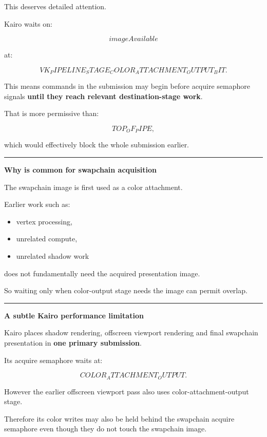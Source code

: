 This deserves detailed attention.

Kairo waits on:

\[
imageAvailable
\]

at:

\[
VK_PIPELINE_STAGE_COLOR_ATTACHMENT_OUTPUT_BIT.
\]

This means commands in the submission may begin before acquire semaphore signals \textbf{until they reach relevant destination-stage work}.

That is more permissive than:

\[
TOP_OF_PIPE,
\]

which would effectively block the whole submission earlier.

\begin{center}\rule{0.5\linewidth}{0.5pt}\end{center}

\textbf{Why  is common for swapchain acquisition}

The swapchain image is first used as a color attachment.

Earlier work such as:

\begin{itemize}
\tightlist
\item
  vertex processing,
\item
  unrelated compute,
\item
  unrelated shadow work
\end{itemize}

does not fundamentally need the acquired presentation image.

So waiting only when color-output stage needs the image can permit overlap.

\begin{center}\rule{0.5\linewidth}{0.5pt}\end{center}

\textbf{A subtle Kairo performance limitation}

Kairo places shadow rendering, offscreen viewport rendering and final swapchain presentation in \textbf{one primary submission}.

Its acquire semaphore waits at:

\[
COLOR_ATTACHMENT_OUTPUT.
\]

However the earlier offscreen viewport pass also uses color-attachment-output stage.

Therefore its color writes may also be held behind the swapchain acquire semaphore even though they do not touch the swapchain image.

